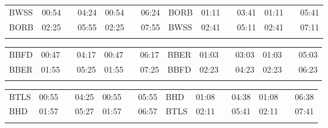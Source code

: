 \begin{center}

\ifpaula
\begin{tabular}{!{\color{magenta}\vrule width 3pt}*{2}{l!{\color{magenta}\vrule width 3pt}*{2}{*{2}{c|}c!{\color{magenta}\vrule width 3pt}}}}
\hline
{}
 &  &  &  \\
\hline
BWSS     &
00:54 &  & 04:24 &
00:54 &  & 06:24 &
BORB     &
01:11 &  & 03:41 &
01:11 &  & 05:41 \\
BORB     &
02:25 & \mgt{}   & 05:55 &
02:25 & \mgt{}   & 07:55 &
BWSS     &
02:41 & \mgt{}   & 05:11 &
02:41 & \mgt{}   & 07:11 \\
\myhline
\end{tabular}
\fi
\ifwulf
\begin{tabular}{!{\color{darkgreen}\vrule width 3pt}*{2}{l!{\color{darkgreen}\vrule width 3pt}*{2}{*{2}{c|}c!{\color{darkgreen}\vrule width 3pt}}}}
\hline
{}
 &  &  &  \\
\hline
BBFD     &
00:47 &  & 04:17 &
00:47 &  & 06:17 &
BBER     &
01:03 &  & 03:03 &
01:03 &  & 05:03 \\
BBER     &
01:55 & \dgr{}   & 05:25 &
01:55 & \dgr{}   & 07:25 &
BBFD     &
02:23 & \dgr{}   & 04:23 &
02:23 & \dgr{}   & 06:23 \\
\myhline
\end{tabular}
\fi
\ifviktor
\begin{tabular}{!{\color{darkgreen}\vrule width 3pt}*{2}{l!{\color{darkgreen}\vrule width 3pt}*{2}{*{2}{c|}c!{\color{darkgreen}\vrule width 3pt}}}}
\hline
{}
 &  &  &  \\
\hline
BTLS     &
00:55 &  & 04:25 &
00:55 &  & 05:55 &
BHD      &
01:08 &  & 04:38 &
01:08 &  & 06:38 \\
BHD      &
01:57 & \dgr{}   & 05:27 &
01:57 & \dgr{}   & 06:57 &
BTLS     &
02:11 & \dgr{}   & 05:41 &
02:11 & \dgr{}   & 07:41 \\
\myhline
\end{tabular}

\end{center}
